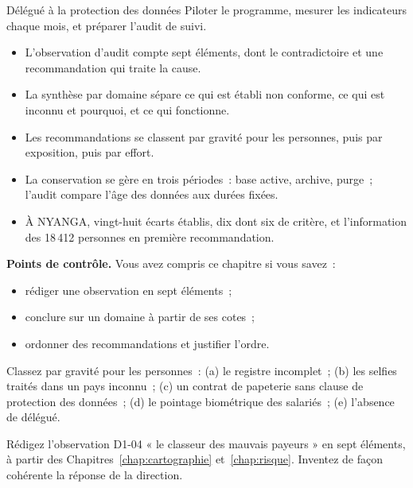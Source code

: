 \begin{boxmetier}{Délégué à la protection des données}
Piloter le programme, mesurer les indicateurs chaque mois, et préparer
l'audit de suivi.
\end{boxmetier}

\begin{boxresume}
\begin{itemize}
    \item L'observation d'audit compte sept éléments, dont le
          contradictoire et une recommandation qui traite la cause.
    \item La synthèse par domaine sépare ce qui est établi non conforme, ce
          qui est inconnu et pourquoi, et ce qui fonctionne.
    \item Les recommandations se classent par gravité pour les personnes,
          puis par exposition, puis par effort.
    \item La conservation se gère en trois périodes~: base active, archive,
          purge~; l'audit compare l'âge des données aux durées fixées.
    \item À NYANGA, vingt-huit écarts établis, dix \NEK{} dont six de
          critère, et l'information des 18\,412 personnes en première
          recommandation.
\end{itemize}
\end{boxresume}

\begin{boxinfo}
\textbf{Points de contrôle.} Vous avez compris ce chapitre si vous savez~:
\begin{itemize}
    \item rédiger une observation en sept éléments~;
    \item conclure sur un domaine à partir de ses cotes~;
    \item ordonner des recommandations et justifier l'ordre.
\end{itemize}
\end{boxinfo}

\begin{boxexo}[title={\ding{45}\quad Exercice~16.1. Ordonner \niveaubase}]
Classez par gravité pour les personnes~: (a) le registre incomplet~; (b) les
selfies traités dans un pays inconnu~; (c) un contrat de papeterie sans
clause de protection des données~; (d) le pointage biométrique des
salariés~; (e) l'absence de délégué.
\end{boxexo}

\begin{boxexo}[title={\ding{45}\quad Exercice~16.2. Une observation \niveaumoyen}]
Rédigez l'observation D1-04 « le classeur des mauvais payeurs » en sept
éléments, à partir des Chapitres~\ref{chap:cartographie} et~\ref{chap:risque}.
Inventez de façon cohérente la réponse de la direction.
\end{boxexo}

